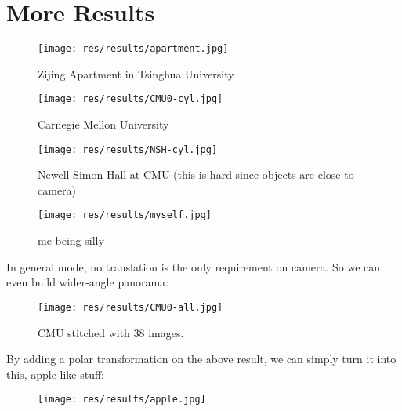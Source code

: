 
\section{More Results}
\begin{figure}[H]
  \centering
  \texttt{[image: res/results/apartment.jpg]}
  \caption{Zijing Apartment in Tsinghua University}
\end{figure}

\begin{figure}[H]
  \centering
  \texttt{[image: res/results/CMU0-cyl.jpg]}
  \caption{Carnegie Mellon University}
\end{figure}

\begin{figure}[H]
  \centering
  \texttt{[image: res/results/NSH-cyl.jpg]}
  \caption{Newell Simon Hall at CMU (this is hard since objects are close to camera)}
\end{figure}
\begin{figure}[H]
  \centering
  \texttt{[image: res/results/myself.jpg]}
  \caption{me being silly}
\end{figure}

In general mode, no translation is the only requirement on camera.
So we can even build wider-angle panorama:
\begin{figure}[H]
  \centering
  \texttt{[image: res/results/CMU0-all.jpg]}
  \caption{CMU stitched with 38 images.}
\end{figure}


\newpage
By adding a polar transformation on the above result, we can simply turn it into this, apple-like stuff:


\begin{figure}[H]
  \centering
  \texttt{[image: res/results/apple.jpg]}
\end{figure}
